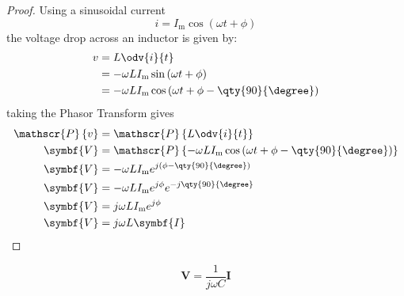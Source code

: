 \documentclass{article}
\begin{document}
\begin{proof}
    Using a sinusoidal current
    \begin{equation*}
        i = I_{\mathrm{m}}\cos{\left( \omega t + \phi \right)}
    \end{equation*}
    the voltage drop across an inductor is given by:
    \begin{align*}
        v & = L \odv{i}{t}                                                                      \\
          & = -\omega L I_{\mathrm{m}} \sin{\left( \omega t + \phi \right)}                     \\
          & = -\omega L I_{\mathrm{m}} \cos{\left( \omega t + \phi - \qty{90}{\degree} \right)}
    \end{align*}
    taking the Phasor Transform gives
    \begin{align*}
        \mathscr{P}\left\{ v \right\} & = \mathscr{P}\left\{ L \odv{i}{t} \right\}                                                                      \\
        \symbf{V}                     & = \mathscr{P}\left\{ -\omega L I_{\mathrm{m}} \cos{\left( \omega t + \phi - \qty{90}{\degree} \right)} \right\} \\
        \symbf{V}                     & = -\omega L I_{\mathrm{m}} e^{j\left( \phi - \qty{90}{\degree} \right)}                                         \\
        \symbf{V}                     & = -\omega L I_{\mathrm{m}} e^{j \phi} e^{-j\qty{90}{\degree}}                                                   \\
        \symbf{V}                     & = j\omega L I_{\mathrm{m}} e^{j \phi}                                                                           \\
        \symbf{V}                     & = j\omega L \symbf{I}
    \end{align*}
\end{proof}
\begin{theorem}
    \begin{equation*}
        \symbf{V} = \frac{1}{j\omega C}\symbf{I}
    \end{equation*}
\end{theorem}
\end{document}
